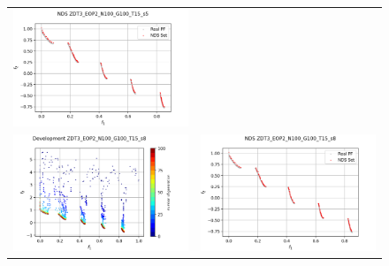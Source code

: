 \begin{figure}[H]
\begin{tabular}{c c}
    \includegraphics[scale=0.45]{figures/ZDT3_EOP2_N100_G100_T15/s5_nds.png}\\
    \includegraphics[scale=0.45]{figures/ZDT3_EOP2_N100_G100_T15/s8_dev.png} &
    \includegraphics[scale=0.45]{figures/ZDT3_EOP2_N100_G100_T15/s8_nds.png}\\

\end{tabular}
\end{figure}
